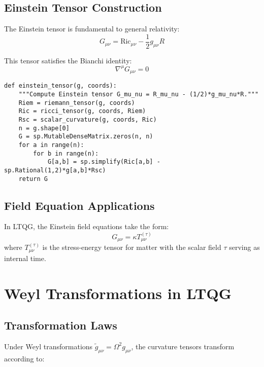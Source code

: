 \documentclass[11pt,a4paper]{article}
\theoremstyle{definition}
\theoremstyle{remark}
\newcommand{\Ric}{\text{Ric}}
\newcommand{\Scal}{R}
\renewcommand{\tilde}[1]{\widetilde{#1}}
\begin{document}
\subsection{Einstein Tensor Construction}

The Einstein tensor is fundamental to general relativity:
\begin{equation}
G_{\mu\nu} = \Ric_{\mu\nu} - \frac{1}{2} g_{\mu\nu} \Scal
\end{equation}

This tensor satisfies the Bianchi identity:
\begin{equation}
\nabla^\mu G_{\mu\nu} = 0
\end{equation}

\begin{lstlisting}
def einstein_tensor(g, coords):
    """Compute Einstein tensor G_mu_nu = R_mu_nu - (1/2)*g_mu_nu*R."""
    Riem = riemann_tensor(g, coords)
    Ric = ricci_tensor(g, coords, Riem)
    Rsc = scalar_curvature(g, coords, Ric)
    n = g.shape[0]
    G = sp.MutableDenseMatrix.zeros(n, n)
    for a in range(n):
        for b in range(n):
            G[a,b] = sp.simplify(Ric[a,b] - sp.Rational(1,2)*g[a,b]*Rsc)
    return G
\end{lstlisting}

\subsection{Field Equation Applications}

In LTQG, the Einstein field equations take the form:
\begin{equation}
G_{\mu\nu} = \kappa T_{\mu\nu}^{(\tau)}
\end{equation}
where $T_{\mu\nu}^{(\tau)}$ is the stress-energy tensor for matter with the scalar field $\tau$ serving as internal time.

\section{Weyl Transformations in LTQG}

\subsection{Transformation Laws}

Under Weyl transformations $\tilde{g}_{\mu\nu} = \Omega^2 g_{\mu\nu}$, the curvature tensors transform according to:
\end{document}
